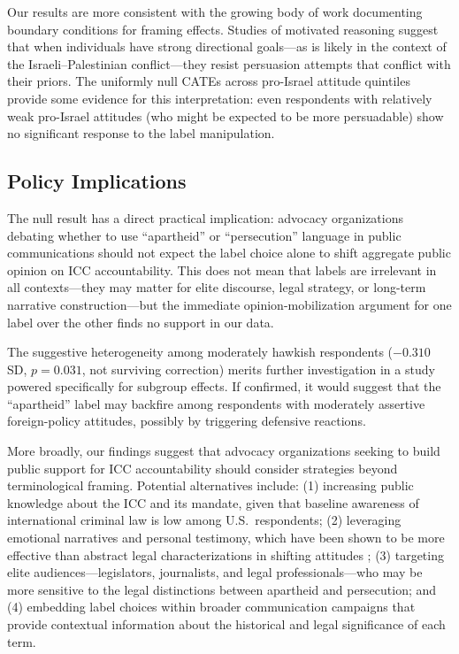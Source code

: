\documentclass[12pt]{article}
\begin{document}
Our results are more consistent with the growing body of work documenting boundary conditions for framing effects. Studies of motivated reasoning suggest that when individuals have strong directional goals---as is likely in the context of the Israeli--Palestinian conflict---they resist persuasion attempts that conflict with their priors. The uniformly null CATEs across pro-Israel attitude quintiles provide some evidence for this interpretation: even respondents with relatively weak pro-Israel attitudes (who might be expected to be more persuadable) show no significant response to the label manipulation.

\subsection{Policy Implications}

The null result has a direct practical implication: advocacy organizations debating whether to use ``apartheid'' or ``persecution'' language in public communications should not expect the label choice alone to shift aggregate public opinion on ICC accountability. This does not mean that labels are irrelevant in all contexts---they may matter for elite discourse, legal strategy, or long-term narrative construction---but the immediate opinion-mobilization argument for one label over the other finds no support in our data.

The suggestive heterogeneity among moderately hawkish respondents ($-0.310$ SD, $p = 0.031$, not surviving correction) merits further investigation in a study powered specifically for subgroup effects. If confirmed, it would suggest that the ``apartheid'' label may backfire among respondents with moderately assertive foreign-policy attitudes, possibly by triggering defensive reactions.

More broadly, our findings suggest that advocacy organizations seeking to build public support for ICC accountability should consider strategies beyond terminological framing. Potential alternatives include: (1) increasing public knowledge about the ICC and its mandate, given that baseline awareness of international criminal law is low among U.S.\ respondents; (2) leveraging emotional narratives and personal testimony, which have been shown to be more effective than abstract legal characterizations in shifting attitudes \citep{lerner2015emotion}; (3) targeting elite audiences---legislators, journalists, and legal professionals---who may be more sensitive to the legal distinctions between apartheid and persecution; and (4) embedding label choices within broader communication campaigns that provide contextual information about the historical and legal significance of each term.
\end{document}
